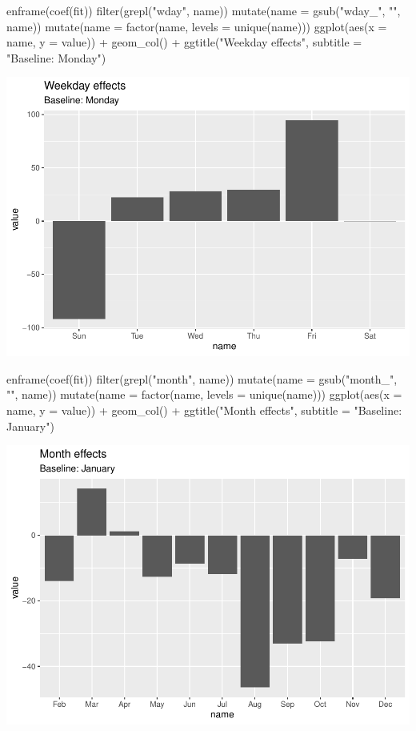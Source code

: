 \begin{Schunk}
\begin{Sinput}
enframe(coef(fit)) %
  filter(grepl("wday", name)) %
  mutate(name = gsub("wday_", "", name)) %
  mutate(name = factor(name, levels = unique(name))) %
  ggplot(aes(x = name, y = value)) +
    geom_col() +
    ggtitle("Weekday effects", subtitle = "Baseline: Monday")
\end{Sinput}

\includegraphics[width=1\linewidth]{overview_files/figure-latex/coeff-plots-1} \begin{Sinput}
enframe(coef(fit)) %
  filter(grepl("month", name)) %
  mutate(name = gsub("month_", "", name)) %
  mutate(name = factor(name, levels = unique(name))) %
  ggplot(aes(x = name, y = value)) +
    geom_col() +
    ggtitle("Month effects", subtitle = "Baseline: January")
\end{Sinput}

\includegraphics[width=1\linewidth]{overview_files/figure-latex/coeff-plots-2} \end{Schunk}

